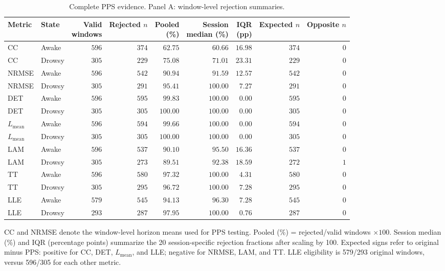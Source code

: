 \begin{table}[p]
\centering
\footnotesize
\setlength{\tabcolsep}{2.2pt}
\renewcommand{\arraystretch}{1.08}
\caption{Complete PPS evidence. Panel A: window-level rejection summaries.}
\label{tab:supp_pps}
\begin{tabular}{llrrrrrrr}
\toprule
Metric & State & \shortstack{Valid\\windows} & \shortstack{Rejected\\$n$} & \shortstack{Pooled\\(\%)} & \shortstack{Session\\median (\%)} & \shortstack{IQR\\(pp)} & \shortstack{Expected\\$n$} & \shortstack{Opposite\\$n$} \\
\midrule
CC & Awake & $596$ & $374$ & $62.75$ & $60.66$ & $16.98$ & $374$ & $0$ \\
CC & Drowsy & $305$ & $229$ & $75.08$ & $71.01$ & $23.31$ & $229$ & $0$ \\
NRMSE & Awake & $596$ & $542$ & $90.94$ & $91.59$ & $12.57$ & $542$ & $0$ \\
NRMSE & Drowsy & $305$ & $291$ & $95.41$ & $100.00$ & $7.27$ & $291$ & $0$ \\
DET & Awake & $596$ & $595$ & $99.83$ & $100.00$ & $0.00$ & $595$ & $0$ \\
DET & Drowsy & $305$ & $305$ & $100.00$ & $100.00$ & $0.00$ & $305$ & $0$ \\
$L_{\mathrm{mean}}$ & Awake & $596$ & $594$ & $99.66$ & $100.00$ & $0.00$ & $594$ & $0$ \\
$L_{\mathrm{mean}}$ & Drowsy & $305$ & $305$ & $100.00$ & $100.00$ & $0.00$ & $305$ & $0$ \\
LAM & Awake & $596$ & $537$ & $90.10$ & $95.50$ & $16.36$ & $537$ & $0$ \\
LAM & Drowsy & $305$ & $273$ & $89.51$ & $92.38$ & $18.59$ & $272$ & $1$ \\
TT & Awake & $596$ & $580$ & $97.32$ & $100.00$ & $4.31$ & $580$ & $0$ \\
TT & Drowsy & $305$ & $295$ & $96.72$ & $100.00$ & $7.28$ & $295$ & $0$ \\
LLE & Awake & $579$ & $545$ & $94.13$ & $96.30$ & $7.28$ & $545$ & $0$ \\
LLE & Drowsy & $293$ & $287$ & $97.95$ & $100.00$ & $0.76$ & $287$ & $0$ \\
\bottomrule
\end{tabular}
\par\smallskip
\begin{minipage}{0.98\linewidth}
\footnotesize CC and NRMSE denote the window-level horizon means used for PPS testing. Pooled (\%) = rejected/valid windows $\times100$. Session median (\%) and IQR (percentage points) summarize the 20 session-specific rejection fractions after scaling by 100. Expected signs refer to original minus PPS: positive for CC, DET, $L_{\mathrm{mean}}$, and LLE; negative for NRMSE, LAM, and TT. LLE eligibility is 579/293 original windows, versus 596/305 for each other metric.
\end{minipage}
\end{table}

